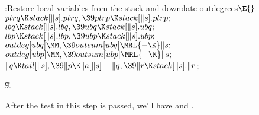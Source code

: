 \B{}:Restore local variables from the stack and
downdate outdegrees\X${}\E{}$\6
$\\{ptrq}\K\\{stack}[\|s].\\{ptrq},\39\\{ptrp}\K\\{stack}[\|s].\\{ptrp};{}$\6
${}\\{lbq}\K\\{stack}[\|s].\\{lbq},\39\\{ubq}\K\\{stack}[\|s].\\{ubq};{}$\6
${}\\{lbp}\K\\{stack}[\|s].\\{lbp},\39\\{ubp}\K\\{stack}[\|s].\\{ubp};{}$\6
${}\\{outdeg}[\\{ubq}]\MM,\39\\{outsum}[\\{ubq}]\MRL{-{\K}}\|s;{}$\6
${}\\{outdeg}[\\{ubp}]\MM,\39\\{outsum}[\\{ubp}]\MRL{-{\K}}\|s;{}$\6
${}\|q\K\\{tail}[\|s],\39\|p\K\|a[\|s]-\|q,\39\|r\K\\{stack}[\|s].\|r{}$;\par
\U9.\fi

After the test in this step is passed, we'll have  and .

